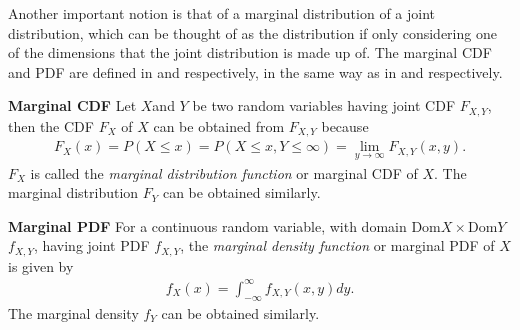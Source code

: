 

Another important notion is that of a marginal distribution of a joint distribution, which can be thought of as the distribution if only considering one of the dimensions that the joint distribution is made up of. The marginal \gls{CDF} and \gls{PDF} are defined in  and  respectively, in the same way as in \citet[p.~81]{evans2004probability} and \citet[p.~34]{wasserman2010statistics} respectively. 

\begin{definition}\label{def:MarginalCDF}
    \textbf{Marginal \gls{CDF}} 
    Let $X$and $Y$ be two random variables having joint \gls{CDF} $F_{X,Y}$, then the \gls{CDF} $F_X$ of $X$ can be obtained from $F_{X,Y}$ because
    \begin{align*}
        F_X(x) =P(X\leq x)
        =P(X\leq x,Y \leq \infty)
        =\lim_{y\to\infty} F_{X,Y}(x,y).
    \end{align*}
    $F_X$ is called the \emph{marginal distribution function} or marginal \gls{CDF} of $X$. The marginal distribution $F_Y$ can be obtained similarly. 
\end{definition}

\begin{definition}\label{def:MarginalPDF}
    \textbf{Marginal \gls{PDF}}
    For a continuous random variable, with domain $\mathrm{Dom}X\times \mathrm{Dom}Y$ $f_{X,Y}$, having joint \gls{PDF} $f_{X,Y}$, the \emph{marginal density function} or marginal \gls{PDF} of $X$ is given by
    \begin{align*}
        f_X(x) = \int_{-\infty}^\infty f_{X,Y}(x,y)dy.
    \end{align*}
    The marginal density $f_Y$ can be obtained similarly. 
\end{definition}

